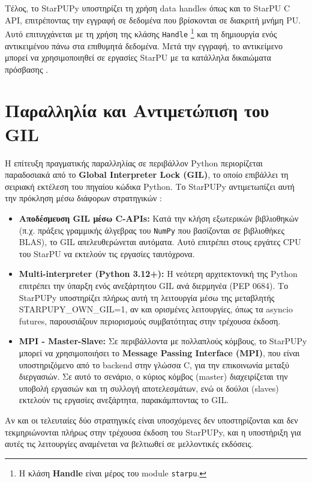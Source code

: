Τέλος, το StarPUPy υποστηρίζει τη χρήση data handles όπως και το StarPU C API, επιτρέποντας την εγγραφή σε δεδομένα που βρίσκονται σε διακριτή μνήμη PU. Αυτό επιτυγχάνεται με τη χρήση της κλάσης \texttt{Handle} \footnote{Η κλάση \textbf{Handle} είναι μέρος του module \texttt{starpu}.} και τη δημιουργία ενός αντικειμένου πάνω στα επιθυμητά δεδομένα. Μετά την εγγραφή, το αντικείμενο μπορεί να χρησιμοποιηθεί σε εργασίες StarPU με τα κατάλληλα δικαιώματα πρόσβασης \cite{starpu2025handbook}.

\section{Παραλληλία και Αντιμετώπιση του GIL}

Η επίτευξη πραγματικής παραλληλίας σε περιβάλλον Python περιορίζεται παραδοσιακά 
από το \textbf{Global Interpreter Lock (GIL)}, το οποίο επιβάλλει τη σειριακή εκτέλεση του πηγαίου κώδικα Python. Το StarPUPy αντιμετωπίζει αυτή την πρόκληση μέσω διάφορων 
στρατηγικών \cite{starpu2025handbook}:

\begin{itemize}
    \item \textbf{Αποδέσμευση GIL μέσω C-APIs:} Κατά την κλήση εξωτερικών βιβλιοθηκών (π.χ. πράξεις γραμμικής άλγεβρας του \texttt{NumPy} που βασίζονται σε βιβλιοθήκες BLAS), το GIL απελευθερώνεται αυτόματα. Αυτό επιτρέπει στους εργάτες CPU του StarPU να εκτελούν τις εργασίες ταυτόχρονα.
    \item \textbf{Multi-interpreter (Python 3.12+):} Η νεότερη αρχιτεκτονική της Python επιτρέπει την ύπαρξη ενός ανεξάρτητου GIL ανά διερμηνέα (PEP 0684). Το StarPUPy υποστηρίζει πλήρως αυτή τη λειτουργία μέσω της μεταβλητής STARPUPY\_OWN\_GIL=1, αν και ορισμένες λειτουργίες, όπως τα asyncio futures, παρουσιάζουν περιορισμούς συμβατότητας στην τρέχουσα έκδοση.
    \item \textbf{MPI - Master-Slave:} Σε περιβάλλοντα με πολλαπλούς κόμβους, το StarPUPy μπορεί να χρησιμοποιήσει το \textbf{Message Passing Interface (MPI)}, που είναι υποστηριζόμενο από το backend στην γλώσσα C, για την επικοινωνία μεταξύ διεργασιών. Σε αυτό το σενάριο, ο κύριος κόμβος (master) διαχειρίζεται την υποβολή εργασιών και τη συλλογή αποτελεσμάτων, ενώ οι δούλοι (slaves) εκτελούν τις εργασίες ανεξάρτητα, παρακάμπτοντας το GIL.
\end{itemize}

Αν και οι τελευταίες δύο στρατηγικές είναι υποσχόμενες δεν υποστηρίζονται και δεν τεκμηριώνονται πλήρως στην τρέχουσα έκδοση του StarPUPy, και η υποστήριξη για αυτές τις λειτουργίες αναμένεται να βελτιωθεί σε μελλοντικές εκδόσεις.

